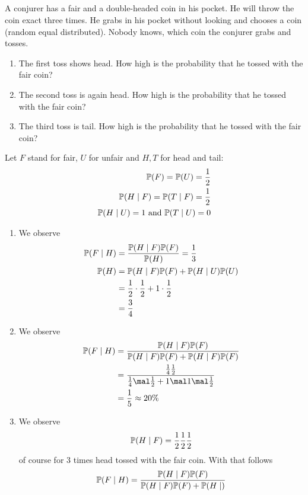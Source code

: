 \subsection{}
A conjurer has a fair and a double-headed coin in his pocket. He will throw the coin exact three times. He grabs in his pocket without looking and chooses a coin (random equal distributed). Nobody knows, which coin the conjurer grabs and tosses.
\begin{enumerate}
	\item The first toss shows head. How high is the probability that he tossed with the fair coin?
	\item The second toss is again head. How high is the probability that he tossed with the fair coin?
	\item The third toss is tail. How high is the probability that he tossed with the fair coin?
\end{enumerate}
\begin{solution}
	Let $F$ stand for fair, $U$ for unfair and $H, T$ for head and tail:
	\begin{align*}
		\mathbb{P}(F) = \mathbb{P}(U) = \frac{1}{2}\\
		\mathbb{P}(H \mid F) = \mathbb{P}(T \mid F) = \frac{1}{2}\\
		\mathbb{P}(H \mid U) = 1 \text{ and } \mathbb{P}(T \mid U) = 0
	\end{align*}
	\begin{enumerate}
		\item We observe
		\begin{align*}
			\mathbb{P}(F \mid H) &= \frac{\mathbb{P}(H \mid F)\mathbb{P}(F)}{\mathbb{P}(H)} = \frac{1}{3}\\
			\mathbb{P}(H) &= \mathbb{P}(H \mid F)\mathbb{P}(F) + \mathbb{P}(H \mid U)\mathbb{P}(U)\\
			&= \frac{1}{2} \cdot \frac{1}{2} + 1 \cdot \frac{1}{2}\\
			&= \frac{3}{4}
		\end{align*}
		\item We observe
		\begin{align*}
			\Meas(F\mid H) &= \frac{\Meas(H \mid F)\Meas(F)}{\Meas(H\mid F)\Meas(F) + \Meas(H \mid F)\Meas(F)}\\
			&= \frac{\frac{1}{4}\frac{1}{2}}{\frac{1}{4}\mal \frac{1}{2} + 1 \mal 1 \mal \frac{1}{2}}\\
			&= \frac{1}{5} \approx 20\%
		\end{align*}
		\item We observe
		\begin{align*}
			\mathbb{P}(H \mid F) = \frac{1}{2}\frac{1}{2}\frac{1}{2}
		\end{align*}
		of course for 3 times head tossed with the fair coin. With that follows
		\begin{align*}
			\Meas(F \mid H) = \frac{\Meas(H \mid F)\Meas(F)}{\Meas(H \mid F)\Meas(F) + \Meas(H \mid )} %
		\end{align*}
	\end{enumerate}
\end{solution}
